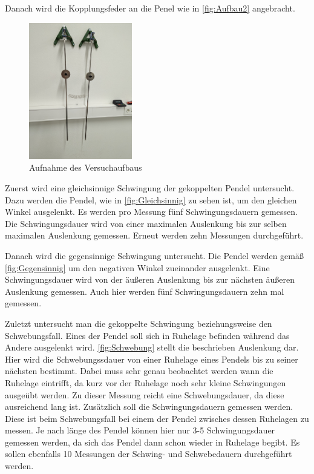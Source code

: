 Danach wird die Kopplungsfeder an die Penel wie in \autoref{fig:Aufbau2} angebracht. 
\begin{figure}
    \centering
    \includegraphics[width=0.4\textwidth]{content/Gekoppelt.jpg}
	\caption{Aufnahme des Versuchaufbaus}
	\label{fig:Aufbau2}
\end{figure}
Zuerst wird eine gleichsinnige Schwingung der gekoppelten Pendel untersucht. Dazu werden die Pendel, wie in \autoref{fig:Gleichsinnig} zu sehen ist, um den gleichen Winkel ausgelenkt.
Es werden pro Messung fünf Schwingungsdauern gemessen. Die Schwingungsdauer wird von einer maximalen Auslenkung bis zur selben maximalen Auslenkung gemessen. Erneut werden zehn
Messungen durchgeführt. 


Danach wird die gegensinnige Schwingung untersucht. Die Pendel werden gemäß \autoref{fig:Gegensinnig} um den negativen Winkel zueinander ausgelenkt. Eine Schwingungsdauer wird von
der äußeren Auslenkung bis zur nächsten äußeren Auslenkung gemessen. Auch hier werden fünf Schwingungsdauern zehn mal gemessen. 


Zuletzt untersucht man die gekoppelte Schwingung beziehungsweise den Schwebungsfall. Eines der Pendel soll sich in Ruhelage befinden während das Andere ausgelenkt wird. 
\autoref{fig:Schwebung} stellt die beschrieben Auslenkung dar. Hier wird die Schwebungssdauer von einer Ruhelage eines Pendels bis zu seiner nächsten bestimmt. Dabei muss sehr
genau beobachtet werden wann die Ruhelage eintrifft, da kurz vor der Ruhelage noch sehr kleine Schwingungen ausgeübt werden. Zu dieser Messung reicht eine Schwebungsdauer, da diese
ausreichend lang ist. Zusätzlich soll die Schwingungsdauern gemessen werden. Diese ist beim Schwebungsfall bei einem der Pendel zwisches dessen Ruhelagen zu messen. Je nach länge 
des Pendel können hier nur 3-5 Schwingungsdauer gemessen werden, da sich das Pendel dann schon wieder in Ruhelage begibt. Es sollen ebenfalls 10 Messungen der Schwing- und Schwebedauern
durchgeführt werden. 